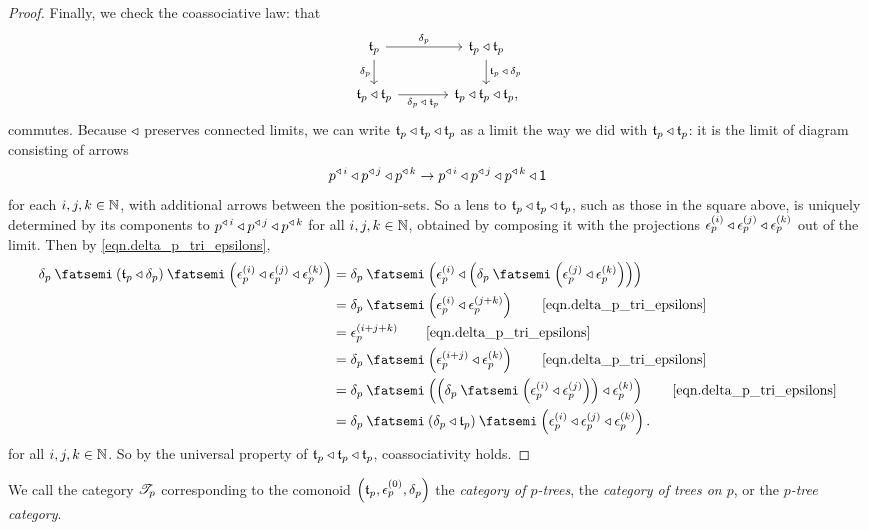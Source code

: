 \documentclass[Book-Poly]{subfiles}
\begin{document}
\begin{proof}
Finally, we check the coassociative law: that
\[
\begin{tikzcd}[column sep=large]
	\car{t}_p\ar[r, "\delta_p"]\ar[d, "\delta_p"']&
	\car{t}_p\tri\car{t}_p\ar[d, "\car{t}_p\:\tri\:\delta_p"]\\
	\car{t}_p\tri\car{t}_p\ar[r, "\delta_p\:\tri\:\car{t}_p"']&
	\car{t}_p\tri\car{t}_p\tri\car{t}_p,
\end{tikzcd}
\]
commutes.
Because $\mathbin{\triangleleft}$ preserves connected limits, we can write $\mathfrak{t}_p\mathbin{\triangleleft}\mathfrak{t}_p\mathbin{\triangleleft}\mathfrak{t}_p$ as a limit the way we did with $\mathfrak{t}_p\mathbin{\triangleleft}\mathfrak{t}_p$: it is the limit of diagram consisting of arrows
\[
    p^{\mathbin{\triangleleft}\,i}\mathbin{\triangleleft} p^{\mathbin{\triangleleft}\,j}\mathbin{\triangleleft} p^{\mathbin{\triangleleft}\,k}\to p^{\mathbin{\triangleleft}\,i}\mathbin{\triangleleft} p^{\mathbin{\triangleleft}\,j}\mathbin{\triangleleft} p^{\mathbin{\triangleleft}\,k}\mathbin{\triangleleft}\textsf{1}
\]
for each $i,j,k\in\mathbb{N}$, with additional arrows between the position-sets.
So a lens to $\mathfrak{t}_p\mathbin{\triangleleft}\mathfrak{t}_p\mathbin{\triangleleft}\mathfrak{t}_p$, such as those in the square above, is uniquely determined by its components to $p^{\mathbin{\triangleleft}\,i}\mathbin{\triangleleft} p^{\mathbin{\triangleleft}\,j}\mathbin{\triangleleft} p^{\mathbin{\triangleleft}\,k}$ for all $i,j,k\in\mathbb{N}$, obtained by composing it with the projections $\epsilon^{(i)}_p\mathbin{\triangleleft}\epsilon^{(j)}_p\mathbin{\triangleleft}\epsilon^{(k)}_p$ out of the limit.
Then by \eqref{eqn.delta_p_tri_epsilons},
\begin{align*}
    \delta_p\then\left(\car{t}_p\tri\delta_p\right)\then\left(\epsilon^{(i)}_p\tri\epsilon^{(j)}_p\tri\epsilon^{(k)}_p\right) &=
    \delta_p\then\left(\epsilon^{(i)}_p\tri\left(\delta_p\then\left(\epsilon^{(j)}_p\tri\epsilon^{(k)}_p\right)\right)\right) \\ &=
    \delta_p\then\left(\epsilon^{(i)}_p\tri\epsilon^{(j+k)}_p\right) \tag*{\eqref{eqn.delta_p_tri_epsilons}} \\ &=
    \epsilon^{(i+j+k)}_p \tag*{\eqref{eqn.delta_p_tri_epsilons}} \\ &=
    \delta_p\then\left(\epsilon^{(i+j)}_p\tri\epsilon^{(k)}_p\right) \tag*{\eqref{eqn.delta_p_tri_epsilons}} \\ &=
    \delta_p\then\left(\left(\delta_p\then\left(\epsilon^{(i)}_p\tri\epsilon^{(j)}_p\right)\right)\tri\epsilon^{(k)}_p\right) \tag*{\eqref{eqn.delta_p_tri_epsilons}} \\ &=
    \delta_p\then\left(\delta_p\tri\car{t}_p\right)\then\left(\epsilon^{(i)}_p\tri\epsilon^{(j)}_p\tri\epsilon^{(k)}_p\right).
\end{align*}
for all $i,j,k\in\mathbb{N}$.
So by the universal property of $\mathfrak{t}_p\mathbin{\triangleleft}\mathfrak{t}_p\mathbin{\triangleleft}\mathfrak{t}_p$, coassociativity holds.
\end{proof}

We call the category $\mathscr{T}_{p}$ corresponding to the comonoid $\left(\mathfrak{t}_p,\epsilon^{(0)}_p,\delta_p\right)$ the \emph{category of $p$-trees}, the \emph{category of trees on $p$}, or the \emph{$p$-tree category}.
\end{document}
